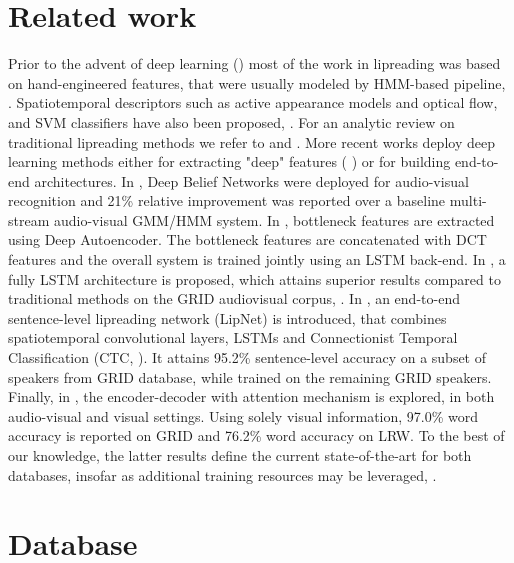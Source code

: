 \documentclass[a4paper]{article}
\begin{document}
\section{Related work}
\label{Related_Work}
Prior to the advent of deep learning (\cite{hinton2012deep}) most of the work in lipreading was based on hand-engineered features, that were usually modeled by HMM-based pipeline, \cite{goldschen1997continuous} \cite{chiou1997lipreading} \cite{potamianos2003recent} \cite{chandrasekaran2009natural} \cite{papandreou2009adaptive}. Spatiotemporal descriptors such as active appearance models and optical flow, and SVM classifiers have also been proposed, \cite{shaikh2010lip}. For an analytic review on traditional lipreading methods we refer to \cite{zhou2014review} and \cite{potamianos2004audio}. More recent works deploy deep learning methods either for extracting "deep" features (\cite{noda2015audio} \cite{thangthai2015improving} \cite{almajai2016improved}) or for building end-to-end architectures. In \cite{huang2013audio}, Deep Belief Networks were deployed for audio-visual recognition and 21\% relative improvement was reported over a baseline multi-stream audio-visual GMM/HMM system. In \cite{petridis2016deep}, bottleneck features are extracted using Deep Autoencoder. The bottleneck features are concatenated with DCT features and the overall system is trained jointly using an LSTM back-end. In \cite{wand2016lipreading}, a fully LSTM architecture is proposed, which attains superior results compared to traditional methods on the GRID audiovisual corpus, \cite{GRID}. In \cite{assael2016lipnet}, an end-to-end sentence-level lipreading network (LipNet) is introduced, that combines spatiotemporal convolutional layers, LSTMs and Connectionist Temporal Classification (CTC, \cite{graves2006connectionist}). It attains 95.2\% sentence-level accuracy on a subset of speakers from GRID database, while trained on the remaining GRID speakers. Finally, in \cite{chung2016lipsent}, the encoder-decoder with attention mechanism is explored, in both audio-visual and visual settings. Using solely visual information, 97.0\% word accuracy is reported on GRID and 76.2\% word accuracy on LRW. To the best of our knowledge, the latter results define the current state-of-the-art for both databases, insofar as additional training resources may be leveraged, \cite{chung2016lipsent}.   
\section{Database}
\label{Database}
\end{document}
